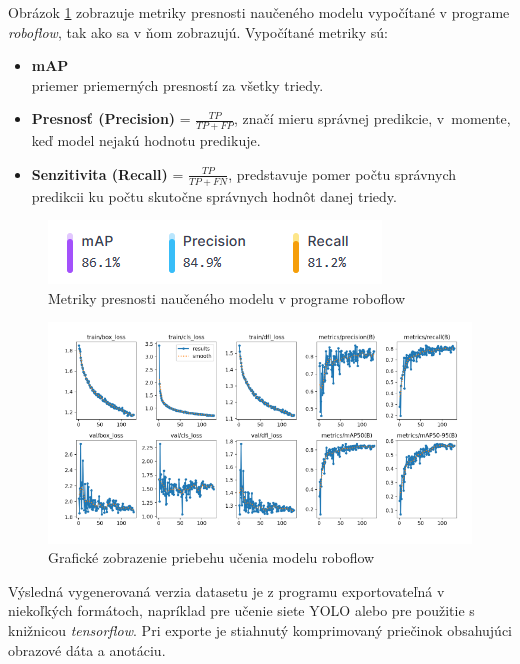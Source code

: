     Obrázok \ref{fig:roboflow_metrics} zobrazuje metriky presnosti naučeného modelu vypočítané v programe \emph{roboflow}, tak ako sa v ňom zobrazujú. Vypočítané metriky sú:

    \begin{itemize}
        \item \textbf{\ac{mAP}} \\ priemer priemerných presností za všetky triedy.
        \item \textbf{Presnosť (Precision)} = \(\frac{TP}{TP + FP}\), značí mieru správnej predikcie, v~momente, keď model nejakú hodnotu predikuje.
        \item \textbf{Senzitivita (Recall)} = \(\frac{TP}{TP + FN}\), predstavuje pomer počtu správnych predikcii ku počtu skutočne správnych hodnôt danej triedy.
    \end{itemize}

    \begin{figure}[H]
        \centering
        \includegraphics[width=.35\textwidth]{obrazky/roboflow/metrics.png}
        \caption{Metriky presnosti naučeného modelu v programe roboflow}
        \label{fig:roboflow_metrics}
    \end{figure}

    \begin{figure}[H]
        \centering
        \includegraphics[width=.8\textwidth]{obrazky/roboflow/train.png}
        \caption{Grafické zobrazenie priebehu učenia modelu roboflow}
    \end{figure}

    Výsledná vygenerovaná verzia datasetu je z programu exportovateľná v niekoľkých formátoch, napríklad pre učenie siete \ac{YOLO} alebo pre použitie s knižnicou \emph{tensorflow}. Pri exporte je stiahnutý komprimovaný priečinok obsahujúci obrazové dáta a anotáciu.


